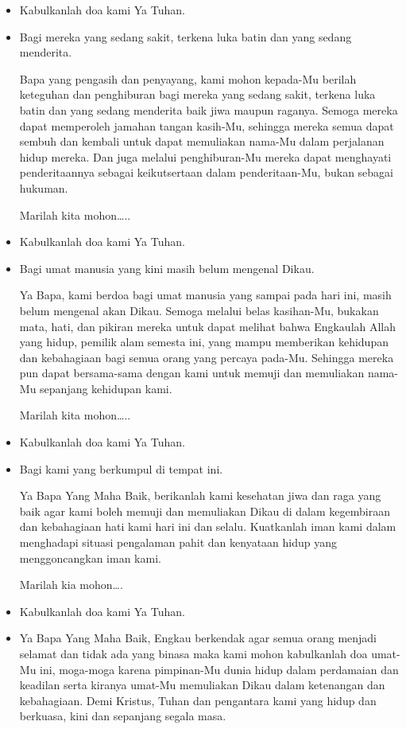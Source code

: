 \documentclass[a4paper,12pt]{article}
\newcommand{\BU}[1]{\begin{itemize} \item[U:] #1 \end{itemize}}
\newcommand{\BP}[1]{\begin{itemize} \item[P:] #1 \end{itemize}}
\begin{document}
\BU{Kabulkanlah doa kami Ya Tuhan.}

\BP{Bagi mereka yang sedang sakit, terkena luka batin dan yang sedang menderita.

Bapa yang pengasih dan penyayang, kami mohon kepada-Mu berilah keteguhan dan penghiburan bagi mereka yang sedang sakit,
terkena luka batin dan yang sedang menderita baik jiwa maupun raganya. Semoga mereka dapat memperoleh jamahan tangan
kasih-Mu, sehingga mereka semua dapat sembuh dan kembali untuk dapat memuliakan nama-Mu dalam perjalanan hidup mereka.
Dan juga melalui penghiburan-Mu mereka dapat menghayati penderitaannya sebagai keikutsertaan dalam penderitaan-Mu,
bukan sebagai hukuman.

Marilah kita mohon{\dots}..}

\BU{Kabulkanlah doa kami Ya Tuhan.}

\BP{Bagi umat manusia yang kini masih belum mengenal Dikau.

Ya Bapa, kami berdoa bagi umat manusia yang sampai pada hari ini, masih belum mengenal akan Dikau. Semoga melalui belas
kasihan-Mu, bukakan mata, hati, dan pikiran mereka untuk dapat melihat bahwa Engkaulah Allah yang hidup, pemilik alam
semesta ini, yang mampu memberikan kehidupan dan kebahagiaan bagi semua orang yang percaya pada-Mu. Sehingga mereka pun
dapat bersama-sama dengan kami untuk memuji dan memuliakan nama-Mu sepanjang kehidupan kami.

Marilah kita mohon{\dots}..}

\BU{Kabulkanlah doa kami Ya Tuhan.}

\BP{Bagi kami yang berkumpul di tempat ini.

Ya Bapa Yang Maha Baik, berikanlah kami kesehatan jiwa dan raga yang baik agar kami boleh memuji dan memuliakan Dikau di
dalam kegembiraan dan kebahagiaan hati kami hari ini dan selalu. Kuatkanlah iman kami dalam menghadapi situasi
pengalaman pahit dan kenyataan hidup yang menggoncangkan iman kami.

Marilah kia mohon{\dots}.}

\BU{Kabulkanlah doa kami Ya Tuhan.}

\BP{Ya Bapa Yang Maha Baik, Engkau berkendak agar semua orang menjadi selamat dan tidak ada yang binasa maka kami mohon
kabulkanlah doa umat-Mu ini, moga-moga karena pimpinan-Mu dunia hidup dalam perdamaian dan keadilan serta kiranya
umat-Mu memuliakan Dikau dalam ketenangan dan kebahagiaan. Demi Kristus, Tuhan dan pengantara kami yang hidup dan
berkuasa, kini dan sepanjang segala masa.}
\end{document}
